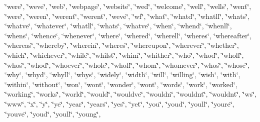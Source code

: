 \char`\"{}we\textquotesingle{}re\char`\"{}, \char`\"{}we\textquotesingle{}ve\char`\"{}, \char`\"{}web\char`\"{}, \char`\"{}webpage\char`\"{}, \char`\"{}website\char`\"{}, \char`\"{}wed\char`\"{}, \char`\"{}welcome\char`\"{}, \char`\"{}well\char`\"{}, \char`\"{}wells\char`\"{}, \char`\"{}went\char`\"{}, \char`\"{}were\char`\"{}, \char`\"{}weren\char`\"{}, \char`\"{}weren\textquotesingle{}t\char`\"{}, \char`\"{}werent\char`\"{}, \char`\"{}weve\char`\"{}, \char`\"{}wf\char`\"{}, \char`\"{}what\char`\"{}, \char`\"{}what\textquotesingle{}d\char`\"{}, \char`\"{}what\textquotesingle{}ll\char`\"{}, \char`\"{}what\textquotesingle{}s\char`\"{}, \char`\"{}what\textquotesingle{}ve\char`\"{}, \char`\"{}whatever\char`\"{}, \char`\"{}whatll\char`\"{}, \char`\"{}whats\char`\"{}, \char`\"{}whatve\char`\"{}, \char`\"{}when\char`\"{}, \char`\"{}when\textquotesingle{}d\char`\"{}, \char`\"{}when\textquotesingle{}ll\char`\"{}, \char`\"{}when\textquotesingle{}s\char`\"{}, \char`\"{}whence\char`\"{}, \char`\"{}whenever\char`\"{}, \char`\"{}where\char`\"{}, \char`\"{}where\textquotesingle{}d\char`\"{}, \char`\"{}where\textquotesingle{}ll\char`\"{}, \char`\"{}where\textquotesingle{}s\char`\"{}, \char`\"{}whereafter\char`\"{}, \char`\"{}whereas\char`\"{}, \char`\"{}whereby\char`\"{}, \char`\"{}wherein\char`\"{}, \char`\"{}wheres\char`\"{}, \char`\"{}whereupon\char`\"{}, \char`\"{}wherever\char`\"{}, \char`\"{}whether\char`\"{}, \char`\"{}which\char`\"{}, \char`\"{}whichever\char`\"{}, \char`\"{}while\char`\"{}, \char`\"{}whilst\char`\"{}, \char`\"{}whim\char`\"{}, \char`\"{}whither\char`\"{}, \char`\"{}who\char`\"{}, \char`\"{}who\textquotesingle{}d\char`\"{}, \char`\"{}who\textquotesingle{}ll\char`\"{}, \char`\"{}who\textquotesingle{}s\char`\"{}, \char`\"{}whod\char`\"{}, \char`\"{}whoever\char`\"{}, \char`\"{}whole\char`\"{}, \char`\"{}wholl\char`\"{}, \char`\"{}whom\char`\"{}, \char`\"{}whomever\char`\"{}, \char`\"{}whos\char`\"{}, \char`\"{}whose\char`\"{}, \char`\"{}why\char`\"{}, \char`\"{}why\textquotesingle{}d\char`\"{}, \char`\"{}why\textquotesingle{}ll\char`\"{}, \char`\"{}why\textquotesingle{}s\char`\"{}, \char`\"{}widely\char`\"{}, \char`\"{}width\char`\"{}, \char`\"{}will\char`\"{}, \char`\"{}willing\char`\"{}, \char`\"{}wish\char`\"{}, \char`\"{}with\char`\"{}, \char`\"{}within\char`\"{}, \char`\"{}without\char`\"{}, \char`\"{}won\char`\"{}, \char`\"{}won\textquotesingle{}t\char`\"{}, \char`\"{}wonder\char`\"{}, \char`\"{}wont\char`\"{}, \char`\"{}words\char`\"{}, \char`\"{}work\char`\"{}, \char`\"{}worked\char`\"{}, \char`\"{}working\char`\"{}, \char`\"{}works\char`\"{}, \char`\"{}world\char`\"{}, \char`\"{}would\char`\"{}, \char`\"{}would\textquotesingle{}ve\char`\"{}, \char`\"{}wouldn\char`\"{}, \char`\"{}wouldn\textquotesingle{}t\char`\"{}, \char`\"{}wouldnt\char`\"{}, \char`\"{}ws\char`\"{}, \char`\"{}www\char`\"{}, \char`\"{}x\char`\"{}, \char`\"{}y\char`\"{}, \char`\"{}ye\char`\"{}, \char`\"{}year\char`\"{}, \char`\"{}years\char`\"{}, \char`\"{}yes\char`\"{}, \char`\"{}yet\char`\"{}, \char`\"{}you\char`\"{}, \char`\"{}you\textquotesingle{}d\char`\"{}, \char`\"{}you\textquotesingle{}ll\char`\"{}, \char`\"{}you\textquotesingle{}re\char`\"{}, \char`\"{}you\textquotesingle{}ve\char`\"{}, \char`\"{}youd\char`\"{}, \char`\"{}youll\char`\"{}, \char`\"{}young\char`\"{}, 